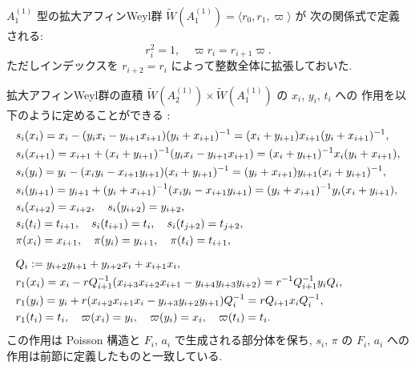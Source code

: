 \documentclass[12pt,twoside,dvipdfm]{msjproc}
\theoremstyle{definition} %
\theoremstyle{definition} %
\theoremstyle{definition} %
\numberwithin{theorem}{section}
\numberwithin{equation}{section}
\numberwithin{figure}{section}
\numberwithin{table}{section}
\newcommand\bra{\langle}
\newcommand\ket{\rangle}
\newcommand\WW{\widetilde{W}}
\begin{document}
$A^{(1)}_1$ 型の拡大アフィンWeyl群 $\WW(A^{(1)}_1)=\bra r_0,r_1,\varpi\ket$ が
次の関係式で定義される:
\begin{equation*}
 r_i^2=1, \quad
 \varpi r_i = r_{i+1} \varpi.
\end{equation*}
ただしインデックスを $r_{i+2}=r_i$ によって整数全体に拡張しておいた. 

拡大アフィンWeyl群の直積 $\WW(A^{(1)}_2)\times\WW(A^{(1)}_1)$ の $x_i$, $y_i$, $t_i$ への
作用を以下のように定めることができる%
:
\begin{align*}
 &
 s_i(x_i) 
 = x_i - (y_i x_i - y_{i+1}x_{i+1})(y_i+x_{i+1})^{-1}
 = (x_i+y_{i+1})x_{i+1}(y_i+x_{i+1})^{-1},
 \\ &
 s_i(x_{i+1})
 = x_{i+1} +(x_i+y_{i+1})^{-1}(y_i x_i - y_{i+1}x_{i+1})
 =(x_i+y_{i+1})^{-1} x_i (y_i+x_{i+1}),
 \\ &
 s_i(y_i) 
 = y_i - (x_i y_i - x_{i+1}y_{i+1})(x_i+y_{i+1})^{-1}
 = (y_i+x_{i+1})y_{i+1}(x_i+y_{i+1})^{-1},
 \\ &
  s_i(y_{i+1})
 = y_{i+1} +(y_i+x_{i+1})^{-1}(x_i y_i - x_{i+1}y_{i+1})
 =(y_i+x_{i+1})^{-1} y_i (x_i+y_{i+1}),
 \\ &
 s_i(x_{i+2})=x_{i+2},
 \quad
 s_i(y_{i+2})=y_{i+2}, 
 \\ &
 s_i(t_i)=t_{i+1},  \quad
 s_i(t_{i+1})=t_i,  \quad
 s_i(t_{j+2})=t_{j+2},
 \\ &
 \pi(x_i) = x_{i+1},  \quad
 \pi(y_i) = y_{i+1},  \quad
 \pi(t_i) = t_{i+1},
 \\[\medskipamount] &
 Q_i := y_{i+2}y_{i+1} + y_{i+2}x_i + x_{i+1}x_i, 
 \\ &
 r_1(x_i) 
 = x_i - r Q_{i+1}^{-1}(x_{i+3}x_{i+2}x_{i+1}-y_{i+4}y_{i+3}y_{i+2})
 = r^{-1} Q_{i+1}^{-1}y_i Q_i,
 \\ &
 r_1(y_i)
 = y_i + r(x_{i+2}x_{i+1}x_i-y_{i+3}y_{i+2}y_{i+1})Q_i^{-1}
 = r Q_{i+1} x_i Q_i^{-1},
 \\ &
 r_1(t_i) = t_i, \quad
 \varpi(x_i)=y_i,   \quad
 \varpi(y_i)=x_i,   \quad
 \varpi(t_i)=t_i.
\end{align*}
この作用は Poisson 構造と $F_i$, $a_i$ で生成される部分体を保ち, 
$s_i$, $\pi$ の $F_i$, $a_i$ への作用は前節に定義したものと一致している.
\end{document}
